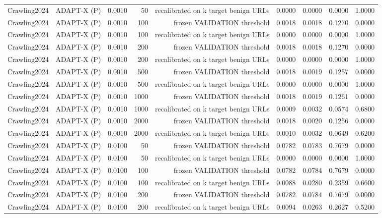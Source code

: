 \begin{table}[t]
\begin{tabular}{llrrrrrrr}
Crawling2024 & ADAPT-X (P) & 0.0010 & 50 & recalibrated on k target benign URLs & 0.0000 & 0.0000 & 0.0000 & 1.0000 \\
Crawling2024 & ADAPT-X (P) & 0.0010 & 100 & frozen VALIDATION threshold & 0.0018 & 0.0018 & 0.1270 & 0.0000 \\
Crawling2024 & ADAPT-X (P) & 0.0010 & 100 & recalibrated on k target benign URLs & 0.0000 & 0.0000 & 0.0000 & 1.0000 \\
Crawling2024 & ADAPT-X (P) & 0.0010 & 200 & frozen VALIDATION threshold & 0.0018 & 0.0018 & 0.1270 & 0.0000 \\
Crawling2024 & ADAPT-X (P) & 0.0010 & 200 & recalibrated on k target benign URLs & 0.0000 & 0.0000 & 0.0000 & 1.0000 \\
Crawling2024 & ADAPT-X (P) & 0.0010 & 500 & frozen VALIDATION threshold & 0.0018 & 0.0019 & 0.1257 & 0.0000 \\
Crawling2024 & ADAPT-X (P) & 0.0010 & 500 & recalibrated on k target benign URLs & 0.0000 & 0.0000 & 0.0000 & 1.0000 \\
Crawling2024 & ADAPT-X (P) & 0.0010 & 1000 & frozen VALIDATION threshold & 0.0018 & 0.0019 & 0.1261 & 0.0000 \\
Crawling2024 & ADAPT-X (P) & 0.0010 & 1000 & recalibrated on k target benign URLs & 0.0009 & 0.0032 & 0.0574 & 0.6800 \\
Crawling2024 & ADAPT-X (P) & 0.0010 & 2000 & frozen VALIDATION threshold & 0.0018 & 0.0020 & 0.1256 & 0.0000 \\
Crawling2024 & ADAPT-X (P) & 0.0010 & 2000 & recalibrated on k target benign URLs & 0.0010 & 0.0032 & 0.0649 & 0.6200 \\
Crawling2024 & ADAPT-X (P) & 0.0100 & 50 & frozen VALIDATION threshold & 0.0782 & 0.0783 & 0.7679 & 0.0000 \\
Crawling2024 & ADAPT-X (P) & 0.0100 & 50 & recalibrated on k target benign URLs & 0.0000 & 0.0000 & 0.0000 & 1.0000 \\
Crawling2024 & ADAPT-X (P) & 0.0100 & 100 & frozen VALIDATION threshold & 0.0782 & 0.0784 & 0.7679 & 0.0000 \\
Crawling2024 & ADAPT-X (P) & 0.0100 & 100 & recalibrated on k target benign URLs & 0.0088 & 0.0280 & 0.2359 & 0.6600 \\
Crawling2024 & ADAPT-X (P) & 0.0100 & 200 & frozen VALIDATION threshold & 0.0782 & 0.0784 & 0.7679 & 0.0000 \\
Crawling2024 & ADAPT-X (P) & 0.0100 & 200 & recalibrated on k target benign URLs & 0.0094 & 0.0263 & 0.2627 & 0.5200 \\

\end{tabular}
\end{table}
